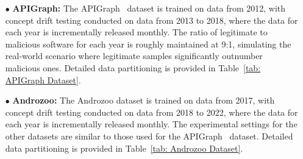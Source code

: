 \begin{itemize}[leftmargin=*]
	\item[$\bullet$] \textbf{APIGraph:} The APIGraph~\cite{2020-CCS-APIGraph} dataset is trained on data from 2012, with concept drift testing conducted on data from 2013 to 2018, where the data for each year is incrementally released monthly.
	The ratio of legitimate to malicious software for each year is roughly maintained at 9:1, simulating the real-world scenario where legitimate samples significantly outnumber malicious ones.
	Detailed data partitioning is provided in Table~\ref{tab: APIGraph Dataset}.
	
	\item[$\bullet$] \textbf{Androzoo:} The Androzoo\cite{2016-Androzoo} dataset is trained on data from 2017, with concept drift testing conducted on data from 2018 to 2022, where the data for each year is incrementally released monthly.
	The experimental settings for the other datasets are similar to those used for the APIGraph~\cite{2020-CCS-APIGraph} dataset.
	Detailed data partitioning is provided in Table~\ref{tab: Androzoo Dataset}.
	
	\begin{table}[h!]
		\caption{Android Concept Drift Dataset (Androzoo)}
		\label{tab: Androzoo Dataset}
		\setlength{\tabcolsep}{5.8pt}
		\begin{center}
		\end{center}
	\end{table}
	

\end{itemize}
